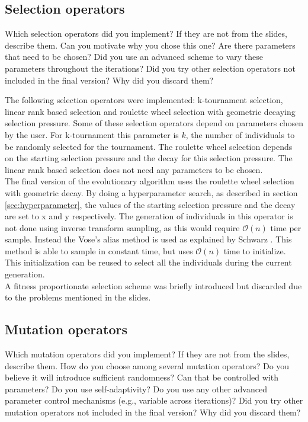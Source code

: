 \documentclass[a4paper,10pt]{article}
\newcommand{\ReplaceMe}[1]{{\color{blue}#1}}
\begin{document}
\subsection{Selection operators}

\ReplaceMe{Which selection operators did you implement? If they are not from the slides, describe them. Can you motivate why you chose this one? Are there parameters that need to be chosen? Did you use an advanced scheme to vary these parameters throughout the iterations? Did you try other selection operators not included in the final version? Why did you discard them?}

The following selection operators were implemented: k-tournament selection, linear rank based selection and roulette wheel selection with geometric decaying selection pressure. Some of these selection operators depend on parameters chosen by the user. For k-tournament this parameter is $k$, the number of individuals to be randomly selected for the tournament. The roulette wheel selection depends on the starting selection pressure and the decay for this selection pressure. The linear rank based selection does not need any parameters to be chosen.\\
The final version of the evolutionary algorithm uses the roulette wheel selection with geometric decay. By doing a hyperparameter search, as described in section \ref{sec:hyperparameter}, the values of the starting selection pressure and the decay are set to \ReplaceMe{x and y} respectively. The generation of individuals in this operator is not done using inverse transform sampling, as this would require $\mathcal{O}(n)$ time per sample. Instead the Vose's alias method is used as explained by Schwarz \cite{schwarz, vose}. This method is able to sample in constant time, but uses $\mathcal{O}(n)$ time to initialize. This initialization can be reused to select all the individuals during the current generation.\\
A fitness proportionate selection scheme was briefly introduced but discarded due to the problems mentioned in the slides.

\subsection{Mutation operators} \label{sec:mutation}

\ReplaceMe{Which mutation operators did you implement? If they are not from the slides, describe them. How do you choose among several mutation operators? Do you believe it will introduce sufficient randomness? Can that be controlled with parameters? Do you use self-adaptivity? Do you use any other advanced parameter control mechanisms (e.g., variable across iterations)? Did you try other mutation operators not included in the final version? Why did you discard them?}
\end{document}
